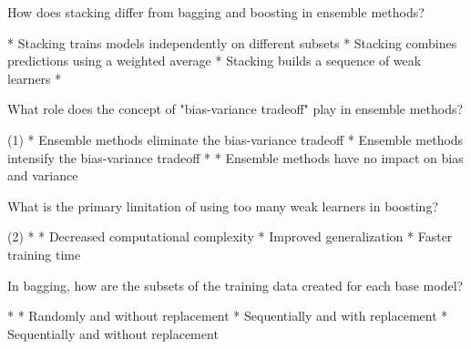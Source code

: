 \documentclass[10pt]{extarticle}
\begin{document}
\begin{exercise}
    How does stacking differ from bagging and boosting in ensemble methods?
    \begin{choice}
        * Stacking trains models independently on different subsets
        * Stacking combines predictions using a weighted average
        * Stacking builds a sequence of weak learners
        * 
    \end{choice}
\end{exercise}
\begin{solution}
\end{solution}

\begin{exercise}
    What role does the concept of "bias-variance tradeoff" play in ensemble methods?
    \begin{choice} (1)
        * Ensemble methods eliminate the bias-variance tradeoff
        * Ensemble methods intensify the bias-variance tradeoff
        * 
        * Ensemble methods have no impact on bias and variance
    \end{choice}
\end{exercise}
\begin{solution}
\end{solution}

\begin{exercise}
    What is the primary limitation of using too many weak learners in boosting?
    \begin{choice} (2)
        * 
        * Decreased computational complexity
        * Improved generalization
        * Faster training time
    \end{choice}
\end{exercise}
\begin{solution}
\end{solution}

\begin{exercise}
    In bagging, how are the subsets of the training data created for each base model?
    \begin{choice}
        * 
        * Randomly and without replacement
        * Sequentially and with replacement
        * Sequentially and without replacement
    \end{choice}
\end{exercise}
\begin{solution}
\end{solution}
\end{document}
